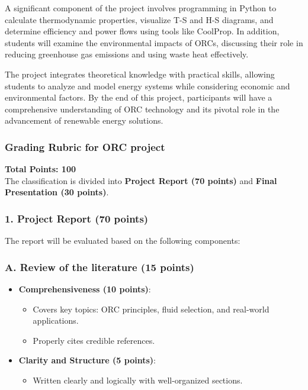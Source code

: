 \documentclass[11pt]{article}
\begin{document}
A significant component of the project involves programming in Python to calculate thermodynamic properties, visualize T-S and H-S diagrams, and determine efficiency and power flows using tools like CoolProp. In addition, students will examine the environmental impacts of ORCs, discussing their role in reducing greenhouse gas emissions and using waste heat effectively.

The project integrates theoretical knowledge with practical skills, allowing students to analyze and model energy systems while considering economic and environmental factors. By the end of this project, participants will have a comprehensive understanding of ORC technology and its pivotal role in the advancement of renewable energy solutions. 
\subsubsection*{Grading Rubric for ORC project}

\textbf{Total Points: 100}\\
The classification is divided into \textbf{Project Report (70 points)} and \textbf{Final Presentation (30 points)}.

\subsubsection*{1. Project Report (70 points)}
The report will be evaluated based on the following components:

\subsubsection*{A. Review of the literature (15 points)}
\begin{itemize}
    \item \textbf{Comprehensiveness (10 points)}:
    \begin{itemize}
        \item Covers key topics: ORC principles, fluid selection, and real-world applications.
        \item Properly cites credible references.
    \end{itemize}
    \item \textbf{Clarity and Structure (5 points)}:
    \begin{itemize}
        \item Written clearly and logically with well-organized sections.
    \end{itemize}
\end{itemize}
\end{document}

